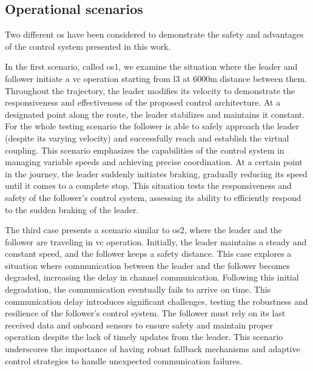 \documentclass[letterpaper, 10 pt, conference]{ieeeconf}
\theoremstyle{definition}
\theoremstyle{nopoint}
\begin{document}
 \subsection{Operational scenarios}
  \label{sec:OperationalScenarios}
  
  Two different \gls{os} have been considered to demonstrate the safety and advantages of the control system presented in this work. 
  
  In the first scenario, called \gls{os}1, we examine the situation where the leader and follower initiate a \gls{vc} operation starting from \gls{l3} at $6000\unit{\meter}$ distance between them. Throughout the trajectory, the leader modifies its velocity to demonstrate the responsiveness and effectiveness of the proposed control architecture. At a designated point along the route, the leader stabilizes and maintains it constant. For the whole testing scenario the follower is able to safely approach the leader (despite its varying velocity) and successfully reach and establish the virtual coupling. This scenario emphasizes the capabilities of the control system in managing variable speeds and achieving precise coordination. At a certain point in the journey, the leader suddenly initiates braking, gradually reducing its speed until it comes to a complete stop. This situation tests the responsiveness and safety of the follower's control system, assessing its ability to efficiently respond to the sudden braking of the leader.
  
  The third case presents a scenario similar to \gls{os}2, where the leader and the follower are traveling in \gls{vc} operation. Initially, the leader maintains a steady and constant speed, and the follower keeps a safety distance. This case explores a situation where communication between the leader and the follower becomes degraded, increasing the delay in channel communication. Following this initial degradation, the communication eventually fails to arrive on time. This communication delay introduces significant challenges, testing the robustness and resilience of the follower's control system. The follower must rely on its last received data and onboard sensors to ensure safety and maintain proper operation despite the lack of timely updates from the leader. This scenario underscores the importance of having robust fallback mechanisms and adaptive control strategies to handle unexpected communication failures.
  
\end{document}
